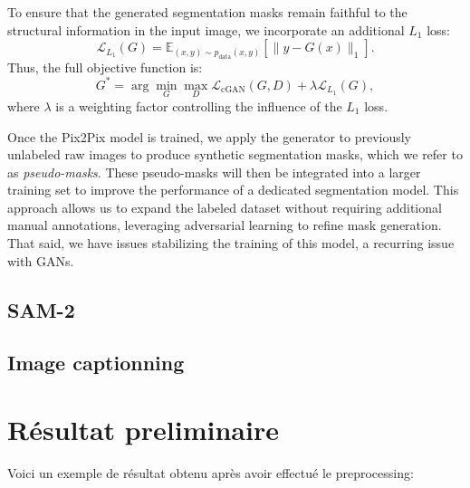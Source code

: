 \documentclass[]{article}
\begin{document}
To ensure that the generated segmentation masks remain faithful to the structural information in the input image, we incorporate an additional \( L_1 \) loss:
\begin{equation}
    \mathcal{L}_{L_1}(G) = \mathbb{E}_{(x,y) \sim p_{\text{data}}(x,y)} \left[ \| y - G(x) \|_1 \right].
\end{equation}
Thus, the full objective function is:
\begin{equation}
    G^* = \arg \min_G \max_D \mathcal{L}_{\text{cGAN}}(G, D) + \lambda \mathcal{L}_{L_1}(G),
\end{equation}
where \( \lambda \) is a weighting factor controlling the influence of the \( L_1 \) loss.

Once the Pix2Pix model is trained, we apply the generator to previously unlabeled raw images to produce synthetic segmentation masks, which we refer to as \textit{pseudo-masks}. These pseudo-masks will then be integrated into a larger training set to improve the performance of a dedicated segmentation model. This approach allows us to expand the labeled dataset without requiring additional manual annotations, leveraging adversarial learning to refine mask generation. That said, we have issues stabilizing the training of this model, a recurring issue with GANs. 

\subsection{SAM-2}



\subsection{Image captionning}



\section{Résultat preliminaire}
Voici un exemple de résultat obtenu après avoir effectué le preprocessing:
\end{document}
